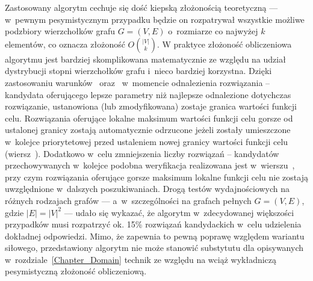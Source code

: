 {  Zastosowany algorytm cechuje się dość kiepską złożonością teoretyczną --- w~pewnym pesymistycznym przypadku będzie on rozpatrywał wszystkie możliwe podzbiory wierzchołków grafu $G=(V, E)$ o~rozmiarze co najwyżej $k$ elementów, co oznacza złożoność $O{|V| \choose k}$.
  W praktyce złożoność obliczeniowa algorytmu jest bardziej skomplikowana matematycznie ze względu na udział dystrybucji stopni wierzchołków grafu i~nieco bardziej korzystna.
  Dzięki zastosowaniu warunków~ oraz~ w~momencie odnalezienia rozwiązania -- kandydata oferującego lepsze parametry niż najlepsze odnalezione dotychczas rozwiązanie, ustanowiona (lub zmodyfikowana) zostaje granica wartości funkcji celu.
  Rozwiązania oferujące lokalne maksimum wartości funkcji celu gorsze od ustalonej granicy zostają automatycznie odrzucone jeżeli zostały umieszczone w~kolejce priorytetowej przed ustaleniem nowej granicy wartości funkcji celu (wiersz~).
  Dodatkowo w~celu zmniejszenia liczby rozwiązań -- kandydatów przechowywanych w~kolejce podobna weryfikacja realizowana jest w~wierszu~, przy czym rozwiązania oferujące gorsze maksimum lokalne funkcji celu nie zostają uwzględnione w~dalszych poszukiwaniach.
  Drogą testów wydajnościowych na różnych rodzajach grafów --- a~w~szczególności na grafach pełnych $G=(V, E)$, gdzie $|E|=|V|^2$ --- udało się wykazać, że algorytm w~zdecydowanej większości przypadków musi rozpatrzyć ok. 15\% rozwiązań kandydackich w~celu udzielenia dokładnej odpowiedzi.
  Mimo, że zapewnia to pewną poprawę względem wariantu siłowego, przedstawiony algorytm nie może stanowić substytutu dla opisywanych w~rozdziale~\ref{Chapter_Domain} technik ze względu na wciąż wykładniczą pesymistyczną złożoność obliczeniową.
}